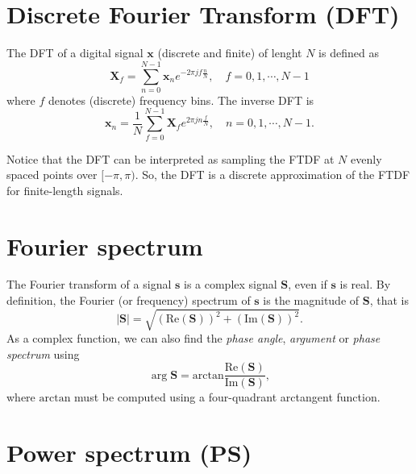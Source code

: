 
\section{Discrete Fourier Transform (DFT)}
\label{sec:DFT}

The \gls{DFT} of a digital signal $\mathbf{x}$ (discrete and finite)
of lenght $N$ is defined as
\begin{equation}
  \mathbf{X}_f=\sum_{n=0}^{N-1}\mathbf{x}_ne^{-2\pi jf\frac{n}{N}},\quad f=0,1,\cdots,N-1
  \label{eq:DFT}
\end{equation}
where $f$ denotes (discrete) frequency bins. The inverse \gls{DFT} is
\begin{equation}
  \mathbf{x}_n=\frac{1}{N}\sum_{f=0}^{N-1}\mathbf{X}_fe^{2\pi jn\frac{f}{N}}, \quad  n=0,1,\cdots,N-1.
\end{equation}

Notice that the \gls{DFT} can be interpreted as sampling the
\gls{FTDF} at $N$ evenly spaced points over $[-\pi, \pi)$. So, the
\gls{DFT} is a discrete approximation of the \gls{FTDF} for
finite-length signals.


\section{Fourier spectrum}
\label{sec:Fourier_spectrum}

The Fourier transform of a signal $\mathbf{s}$ is a complex signal
$\mathbf{S}$, even if $\mathbf{s}$ is real. By definition, the Fourier
(or frequency) spectrum of $\mathbf{s}$ is the magnitude of
$\mathbf{S}$, that is
\begin{equation}
  |\mathbf{S}| = \sqrt{(\text{Re}(\mathbf{S}))^2+(\text{Im}(\mathbf{S}))^2}.
\end{equation}
As a complex function, we can also find the \emph{phase angle}, \emph{argument} or
\emph{phase spectrum} using
\begin{equation}
  \arg{\mathbf{S}} = \text{arctan}\frac{\text{Re}(\mathbf{S})}{\text{Im}(\mathbf{S})},
\end{equation}
where $\text{arctan}$ must be computed using a four-quadrant
arctangent function.


\section{Power spectrum (PS)}
\label{sec:power_spectrum}


